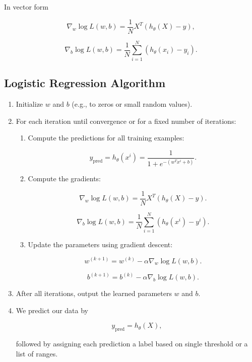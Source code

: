 In vector form

\[
	\nabla_w \log L(w,b) = \frac{1}{N} X^T (h_\theta(X) - y),
\]

\[
	\nabla_b \log L(w,b) = \frac{1}{N} \sum_{i=1}^{N} (h_\theta(x_i) - y_i).
\]

\subsection{Logistic Regression Algorithm}

\begin{enumerate}

	\item Initialize \(w\) and \(b\) (e.g., to zeros or small random values).

	\item For each iteration until convergence or for a fixed number of iterations:

	      \begin{enumerate}

		      \item Compute the predictions for all training examples:

		            \[
			            y_{\text{pred}} = h_\theta(x^i) = \frac{1}{1 + e^{-(w^T x^i + b)}}.
		            \]

		      \item Compute the gradients:

		            \[
			            \nabla_w \log L(w,b) = \frac{1}{N} X^T (h_\theta(X) - y).
		            \]

		            \[
			            \nabla_b \log L(w,b) = \frac{1}{N} \sum_{i=1}^{N} (h_\theta(x^i) - y^i).
		            \]

		      \item Update the parameters using gradient descent:

		            \[
			            w^{(k + 1)} = w^{(k)} - \alpha \nabla_w \log L(w,b).
		            \]

		            \[
			            b^{(k + 1)} = b^{(k)} - \alpha \nabla_b \log L(w,b).
		            \]

	      \end{enumerate}

	\item After all iterations, output the learned parameters \(w\) and \(b\).

	\item We predict our data by

	      \[
		      y_{\text{pred}} = h_\theta(X),
	      \]

	      followed by assigning each prediction a label based on single threshold or a list of ranges.

\end{enumerate}


